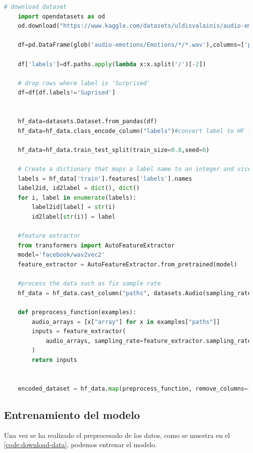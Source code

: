 \begin{lstlisting}[language=Python, caption=Preprocesado del dataset, label={code:download-data}]
    # download dataset
    import opendatasets as od
    od.download("https://www.kaggle.com/datasets/uldisvalainis/audio-emotions")

    df=pd.DataFrame(glob('audio-emotions/Emotions/*/*.wav'),columns=['paths'])

    df['labels']=df.paths.apply(lambda x:x.split('/')[-2])

    # drop rows where label is 'Surprised'
    df=df[df.labels!='Suprised']
    

    hf_data=datasets.Dataset.from_pandas(df)
    hf_data=hf_data.class_encode_column("labels")#convert label to HF label class

    hf_data=hf_data.train_test_split(train_size=0.8,seed=0)

    # Create a dictionary that maps a label name to an integer and vice versa. The mapping will help the model recover the label name from the label number:
    labels = hf_data['train'].features['labels'].names
    label2id, id2label = dict(), dict()
    for i, label in enumerate(labels):
        label2id[label] = str(i)
        id2label[str(i)] = label

    #feature extractor
    from transformers import AutoFeatureExtractor
    model='facebook/wav2vec2'
    feature_extractor = AutoFeatureExtractor.from_pretrained(model)

    #process the data such as fix sample rate
    hf_data = hf_data.cast_column("paths", datasets.Audio(sampling_rate=16_000))
    
    def preprocess_function(examples):
        audio_arrays = [x["array"] for x in examples["paths"]]
        inputs = feature_extractor(
            audio_arrays, sampling_rate=feature_extractor.sampling_rate, max_length=16000*2, truncation=True
        )
        return inputs


    encoded_dataset = hf_data.map(preprocess_function, remove_columns=["paths"], batched=True)


\end{lstlisting}



\subsection{Entrenamiento del modelo}\label{seccion:entrenamiento-del-modelo}
Una vez se ha realizado el preprocesado de los datos, como se muestra en el \autoref{code:download-data}, podemos entrenar el modelo.

